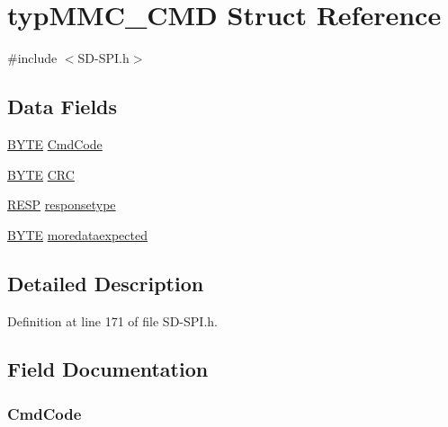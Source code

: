 \hypertarget{structtyp_m_m_c___c_m_d}{}\section{typ\+M\+M\+C\+\_\+\+C\+M\+D Struct Reference}
\label{structtyp_m_m_c___c_m_d}


{\ttfamily \#include $<$S\+D-\/\+S\+P\+I.\+h$>$}

\subsection*{Data Fields}
\begin{DoxyCompactItemize}
\item 
\hyperlink{_generic_type_defs_8h_a4ae1dab0fb4b072a66584546209e7d58}{B\+Y\+T\+E} \hyperlink{structtyp_m_m_c___c_m_d_a9d162c5a428bdd07d9331d2a325705db}{Cmd\+Code}
\item 
\hyperlink{_generic_type_defs_8h_a4ae1dab0fb4b072a66584546209e7d58}{B\+Y\+T\+E} \hyperlink{structtyp_m_m_c___c_m_d_a6fec08b802532658479eb321c4e3aaa0}{C\+R\+C}
\item 
\hyperlink{_s_d-_s_p_i_8h_a69658e0ba42c5888b733c1ef68ae5187}{R\+E\+S\+P} \hyperlink{structtyp_m_m_c___c_m_d_ad3dbb1af1d33fef7cbfdf40aa12e625c}{responsetype}
\item 
\hyperlink{_generic_type_defs_8h_a4ae1dab0fb4b072a66584546209e7d58}{B\+Y\+T\+E} \hyperlink{structtyp_m_m_c___c_m_d_ae3b3fb112797077e7a5dc6d7802a0f46}{moredataexpected}
\end{DoxyCompactItemize}


\subsection{Detailed Description}


Definition at line 171 of file S\+D-\/\+S\+P\+I.\+h.



\subsection{Field Documentation}
\hypertarget{structtyp_m_m_c___c_m_d_a9d162c5a428bdd07d9331d2a325705db}{}
\subsubsection[{Cmd\+Code}]{ Cmd\+Code}\label{structtyp_m_m_c___c_m_d_a9d162c5a428bdd07d9331d2a325705db}


